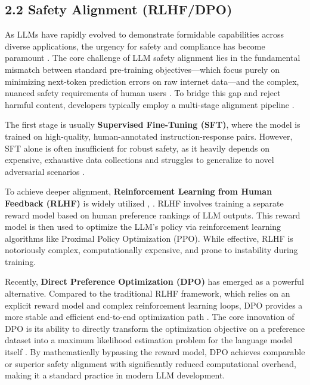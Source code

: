 \documentclass[11pt,a4paper]{article}
\begin{document}
\subsection{2.2 Safety Alignment (RLHF/DPO)}

As LLMs have rapidly evolved to demonstrate formidable capabilities across diverse applications, the urgency for safety and compliance has become paramount \cite{Cheng_2024_LLM}. The core challenge of LLM safety alignment lies in the fundamental mismatch between standard pre-training objectives---which focus purely on minimizing next-token prediction errors on raw internet data---and the complex, nuanced safety requirements of human users \cite{Cheng_2024_LLM}. To bridge this gap and reject harmful content, developers typically employ a multi-stage alignment pipeline \cite{Chen_2024_Rmcbench}.

The first stage is usually \textbf{Supervised Fine-Tuning (SFT)}, where the model is trained on high-quality, human-annotated instruction-response pairs. However, SFT alone is often insufficient for robust safety, as it heavily depends on expensive, exhaustive data collections and struggles to generalize to novel adversarial scenarios \cite{Liu_2025_Purpcode}. 

To achieve deeper alignment, \textbf{Reinforcement Learning from Human Feedback (RLHF)} is widely utilized \cite{Chen_2024_Rmcbench}, \cite{Liu_2025_Purpcode}. RLHF involves training a separate reward model based on human preference rankings of LLM outputs. This reward model is then used to optimize the LLM's policy via reinforcement learning algorithms like Proximal Policy Optimization (PPO). While effective, RLHF is notoriously complex, computationally expensive, and prone to instability during training.

Recently, \textbf{Direct Preference Optimization (DPO)} has emerged as a powerful alternative. Compared to the traditional RLHF framework, which relies on an explicit reward model and complex reinforcement learning loops, DPO provides a more stable and efficient end-to-end optimization path \cite{Yu_2025_LLMs}. The core innovation of DPO is its ability to directly transform the optimization objective on a preference dataset into a maximum likelihood estimation problem for the language model itself \cite{Yu_2025_LLMs}. By mathematically bypassing the reward model, DPO achieves comparable or superior safety alignment with significantly reduced computational overhead, making it a standard practice in modern LLM development.
\end{document}
